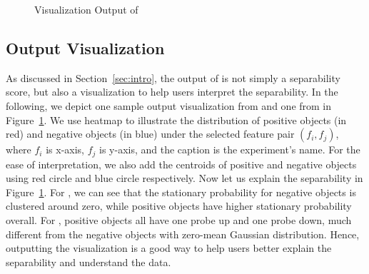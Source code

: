 


\begin{figure}[h]
\centering     %
\vspace{-3mm}
\vspace{-5mm}
\caption{Visualization Output of \genviz}
\vspace{-5mm}
\label{fig:viz}
\end{figure}

\subsection{Output Visualization}
As discussed in Section~\ref{sec:intro}, the output of \genviz is not simply a separability score, but also a visualization to help users interpret the separability. 
In the following, we depict one sample output visualization from \msig and one from \lincs in Figure~\ref{fig:viz}. We use heatmap to illustrate the distribution of positive objects (in red) and negative objects (in blue) under the selected feature pair $(f_i,f_j)$, where $f_i$ is x-axis, $f_j$ is y-axis, and the caption is the experiment's name. For the ease of interpretation, we also add the centroids of positive and negative objects using red circle and blue circle respectively.
Now let us explain the separability in Figure~\ref{fig:viz}. For \msig, we can see that the stationary probability for negative objects is clustered around zero, while positive objects have higher stationary probability overall. For \lincs, positive objects all have one probe up and one probe down, much different from the negative objects with zero-mean Gaussian distribution.
Hence, outputting the visualization is a good way to help users better explain the separability and understand the data. 









